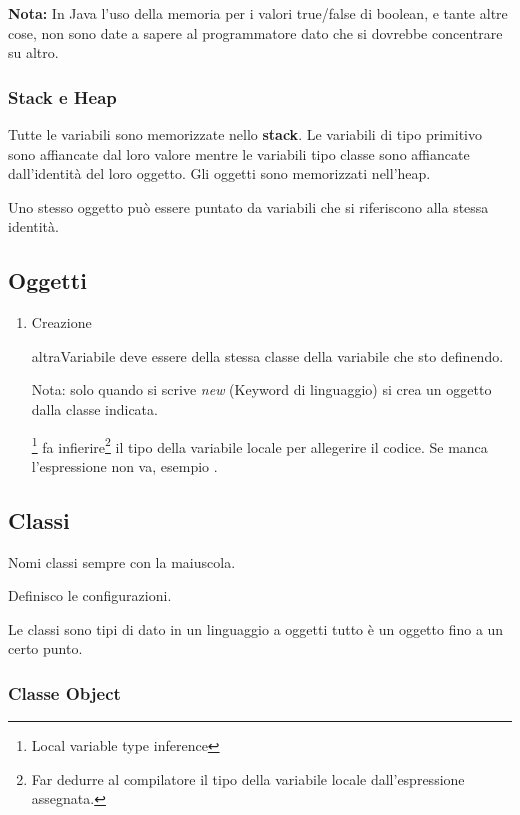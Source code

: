 \textbf{Nota:} In Java l'uso della memoria per i valori true/false di boolean, e tante altre cose, non sono date a sapere al programmatore dato che si dovrebbe concentrare su altro.

\subsubsection{Stack e Heap}
Tutte le variabili sono memorizzate nello \textbf{stack}. Le variabili di tipo primitivo sono affiancate dal loro valore mentre le variabili tipo classe sono affiancate dall'identità del loro oggetto. Gli oggetti sono memorizzati nell'heap.

Uno stesso oggetto può essere puntato da variabili che si riferiscono alla stessa identità.

\subsection{Oggetti}
\begin{enumerate}
	\item Creazione


	altraVariabile deve essere della stessa classe della variabile che sto definendo.

	Nota: solo quando si scrive \textit{new} (Keyword di linguaggio) si crea un oggetto dalla classe indicata.

	\footnote{Local variable type inference} fa infierire\footnote{Far dedurre al compilatore il tipo della variabile locale dall'espressione assegnata.} il tipo della variabile locale per allegerire il codice. Se manca l'espressione non va, esempio .
\end{enumerate}

\subsection{Classi}

Nomi classi sempre con la maiuscola.

Definisco le configurazioni.

Le classi sono tipi di dato in un linguaggio a oggetti tutto è un oggetto fino a un certo punto.

\subsubsection{Classe Object}

